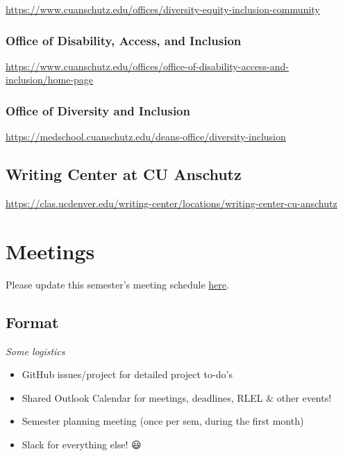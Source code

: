\documentclass[
  letterpaper,
  DIV=11,
  numbers=noendperiod]{scrreprt}
\providecommand{\tightlist}{%
  \setlength{\itemsep}{0pt}\setlength{\parskip}{0pt}}\usepackage{longtable,booktabs,array}
\begin{document}
\url{https://www.cuanschutz.edu/offices/diversity-equity-inclusion-community}

\hypertarget{office-of-disability-access-and-inclusion}{%
\subsection{Office of Disability, Access, and
Inclusion}\label{office-of-disability-access-and-inclusion}}

\url{https://www.cuanschutz.edu/offices/office-of-disability-access-and-inclusion/home-page}

\hypertarget{office-of-diversity-and-inclusion}{%
\subsection{Office of Diversity and
Inclusion}\label{office-of-diversity-and-inclusion}}

\url{https://medschool.cuanschutz.edu/deans-office/diversity-inclusion}

\hypertarget{writing-center-at-cu-anschutz}{%
\section{Writing Center at CU
Anschutz}\label{writing-center-at-cu-anschutz}}

\url{https://clas.ucdenver.edu/writing-center/locations/writing-center-cu-anschutz}


\hypertarget{meetings}{%
\chapter{Meetings}\label{meetings}}

Please update this semester's meeting schedule
\href{https://github.com/JRaviLab/group/tree/master/meetings}{here}.

\hypertarget{format}{%
\section{Format}\label{format}}

\emph{Some logistics}

\begin{itemize}
\tightlist
\item
  GitHub issues/project for detailed project to-do's
\item
  Shared Outlook Calendar for meetings, deadlines, RLEL \& other events!
\item
  Semester planning meeting (once per sem, during the first month)
\item
  Slack for everything else! 😃
\end{itemize}
\end{document}
